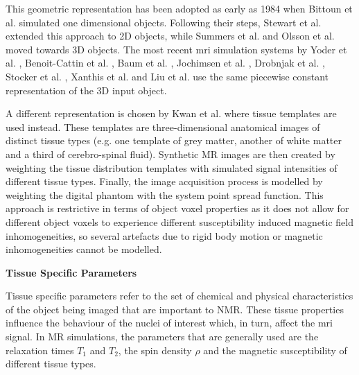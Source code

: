 This geometric representation has been adopted as early as 1984 when Bittoun et al. \cite{Bittoun1984} simulated one dimensional objects.
Following their steps, Stewart et al. \cite{Stewart1986} extended this approach to 2D objects, while Summers et al. \cite{Summers1986} and Olsson et al. \cite{Olsson1995} moved towards 3D objects.
The most recent \ac{mri} simulation systems by 
Yoder et al. \cite{Yoder2004}, 
Benoit-Cattin et al. \cite{Benoit-Cattin2005}, 
Baum et al. \cite{Baum2011}, 
Jochimsen et al. \cite{Jochimsen2004} \cite{Jochimsen2006}, 
Drobnjak et al. \cite{Drobnjak2006} \cite{Drobnjak2010}, 
Stocker et al. \cite{Stocker2010}, 
Xanthis et al. \cite{Xanthis2014} and 
Liu et al. \cite{Liu2013} \cite{Liu2014} \cite{Liu2016} use the same piecewise constant representation of the 3D input object.

\hfill

A different representation is chosen by
Kwan et al. \cite{Kwan1997} \cite{Kwan1999}
where tissue templates \cite{Collins1995} are used instead.
These templates are three-dimensional anatomical images of distinct tissue types (e.g. one template of grey matter, another of white matter and a third of cerebro-spinal fluid). 
Synthetic MR images are then created by weighting the tissue distribution templates with simulated signal intensities of different tissue types.
Finally, the image acquisition process is modelled by weighting the digital phantom with the system point spread function.
This approach is restrictive in terms of object voxel properties as it does not allow for different object voxels to experience different susceptibility induced magnetic field inhomogeneities, so several artefacts due to rigid body motion or magnetic inhomogeneities cannot be modelled.

\hfill

\large \textbf{Tissue Specific Parameters} \normalsize

Tissue specific parameters refer to the set of chemical and physical characteristics of the object being imaged that are important to NMR.
These tissue properties influence the behaviour of the nuclei of interest which, in turn, affect the \ac{mri} signal.
In MR simulations, the parameters that are generally used are the relaxation times $T_1$ and $T_2$, the spin density $\rho$ and the magnetic susceptibility of different tissue types.


